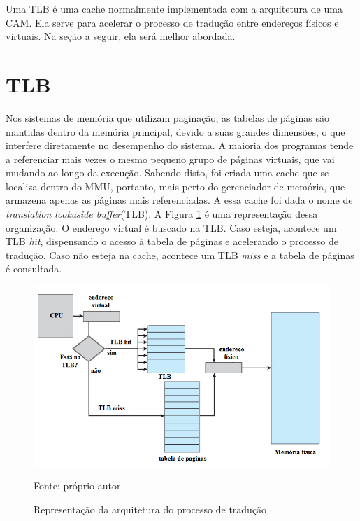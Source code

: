 Uma TLB é uma cache normalmente implementada com a arquitetura de uma CAM. Ela serve para acelerar o processo de tradução entre endereços físicos e virtuais. Na seção a seguir, ela será melhor abordada.

\section{TLB}
Nos sistemas de memória que utilizam paginação, as tabelas de páginas são
mantidas dentro da memória principal, devido a suas grandes dimensões, o que interfere
diretamente no desempenho do sistema. A maioria dos programas tende a referenciar mais vezes o mesmo pequeno grupo de páginas virtuais, que vai mudando ao longo da execução.
Sabendo disto, foi criada uma cache que se localiza dentro do MMU, portanto, mais perto
do gerenciador de memória, que armazena apenas as páginas mais referenciadas. A essa
cache foi dada o nome de \textit{translation lookaside buffer}(TLB). A Figura \ref{fig:arq} é uma representação dessa organização. O endereço virtual é buscado na TLB. Caso esteja, acontece um TLB \textit{hit}, dispensando o acesso à tabela de páginas e acelerando o processo de tradução. Caso não esteja na cache, acontece um TLB \textit{miss} e a tabela de páginas é consultada. 

\begin{figure}[ht]
\centering
\includegraphics[scale=0.7]{figuras/tlbesquema.png}
\caption{Representação da arquitetura do processo de tradução}{Fonte: próprio autor}
\label{fig:arq}
\end{figure}

